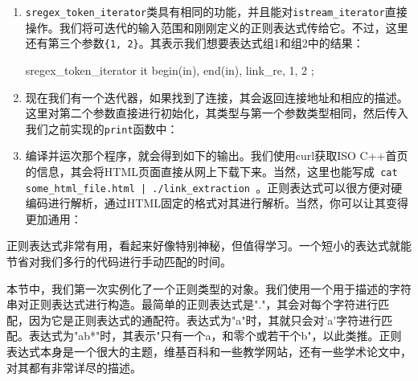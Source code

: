\begin{enumerate}
\begin{codebox}[cpp]
    const regex link_re {
        "<a href=\"([^\"]*)\"[^<]*>([^<]*)</a>"};
\end{codebox}

\item \texttt{sregex\_token\_iterator}类具有相同的功能，并且能对\texttt{istream\_iterator}直接操作。我们将可迭代的输入范围和刚刚定义的正则表达式传给它。不过，这里还有第三个参数\texttt{\{1, 2\}}。其表示我们想要表达式组1和组2中的结果：

\begin{codebox}[cpp]
    sregex_token_iterator it {
        begin(in), end(in), link_re, {1, 2}
    };
\end{codebox}

\item 现在我们有一个迭代器，如果找到了连接，其会返回连接地址和相应的描述。这里对第二个参数直接进行初始化，其类型与第一个参数类型相同，然后传入我们之前实现的\texttt{print}函数中：

\begin{codebox}[cpp]
    print(it, {});
}
\end{codebox}

\item 编译并运次那个程序，就会得到如下的输出。我们使用curl获取ISO C++首页的信息，其会将HTML页面直接从网上下载下来。当然，这里也能写成\texttt{ cat some\_html\_file.html | ./link\_extraction }。正则表达式可以很方便对硬编码进行解析，通过HTML固定的格式对其进行解析。当然，你可以让其变得更加通用：


\end{enumerate}


正则表达式非常有用，看起来好像特别神秘，但值得学习。一个短小的表达式就能节省对我们多行的代码进行手动匹配的时间。

本节中，我们第一次实例化了一个正则类型的对象。我们使用一个用于描述的字符串对正则表达式进行构造。最简单的正则表达式是"."，其会对每个字符进行匹配，因为它是正则表达式的通配符。表达式为"a"时，其就只会对'a'字符进行匹配。表达式为"ab*"时，其表示"只有一个a，和零个或若干个b"，以此类推。正则表达式本身是一个很大的主题，维基百科和一些教学网站，还有一些学术论文中，对其都有非常详尽的描述。

